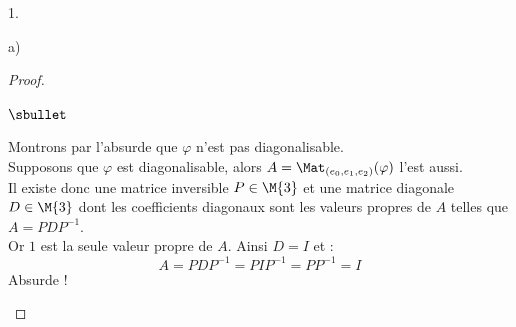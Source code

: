 \begin{noliste}{1.}
\begin{noliste}{a)}
\begin{proof}
\begin{noliste}{$\sbullet$}
      \item Montrons par l'absurde que $\varphi$ n'est pas diagonalisable.\\
        Supposons que $\varphi$ est diagonalisable, alors $A =
        \Mat_{(e_0, e_1, e_2)}(\varphi)$ l'est aussi.\\
        Il existe donc une matrice inversible $P \in \M{3}$ et une
        matrice diagonale $D \in \M{3}$ dont les coefficients
        diagonaux sont les valeurs propres de $A$ telles que $A =
        PDP^{-1}$.\\
        Or $1$ est la seule valeur propre de $A$. Ainsi $D = I$ et :
        \[
        A = PDP^{-1} = PIP^{-1} = PP^{-1} = I
        \]
        Absurde !%


        \newpage



\end{noliste}
\end{proof}
\end{noliste}
\end{noliste}
